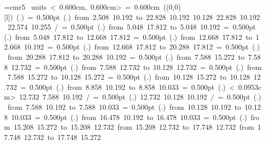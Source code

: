 \font\thinlinefont=cmr5
\mbox{\beginpicture
\setcoordinatesystem units < 0.600cm, 0.600cm>
\unitlength= 0.600cm
\linethickness=1pt
\setplotsymbol ({\makebox(0,0)[l]{\tencirc{}}})
\setshadesymbol ({\thinlinefont .})
\setlinear
%
%
\linethickness= 0.500pt
\setplotsymbol ({\thinlinefont .})
\putrule from  2.508 10.192 to 22.828 10.192
%
%
 10.128 22.828 10.192 22.574 10.255 /
%
%
%
\linethickness= 0.500pt
\setplotsymbol ({\thinlinefont .})
\putrule from  5.048 17.812 to  5.048 10.192
%
%
\linethickness= 0.500pt
\setplotsymbol ({\thinlinefont .})
\putrule from  5.048 17.812 to 12.668 17.812
%
%
\linethickness= 0.500pt
\setplotsymbol ({\thinlinefont .})
\putrule from 12.668 17.812 to 12.668 10.192
%
%
\linethickness= 0.500pt
\setplotsymbol ({\thinlinefont .})
\putrule from 12.668 17.812 to 20.288 17.812
%
%
\linethickness= 0.500pt
\setplotsymbol ({\thinlinefont .})
\putrule from 20.288 17.812 to 20.288 10.192
%
%
\linethickness= 0.500pt
\setplotsymbol ({\thinlinefont .})
\putrule from  7.588 15.272 to  7.588 12.732
%
%
\linethickness= 0.500pt
\setplotsymbol ({\thinlinefont .})
\putrule from  7.588 12.732 to 10.128 12.732
%
%
\linethickness= 0.500pt
\setplotsymbol ({\thinlinefont .})
\putrule from  7.588 15.272 to 10.128 15.272
%
%
\linethickness= 0.500pt
\setplotsymbol ({\thinlinefont .})
\putrule from 10.128 15.272 to 10.128 12.732
%
%
\linethickness= 0.500pt
\setplotsymbol ({\thinlinefont .})
\putrule from  8.858 10.192 to  8.858 10.033
%
%
\linethickness= 0.500pt
\setplotsymbol ({\thinlinefont .})
\setdots < 0.0953cm>
 12.732  7.588 10.192 /
%
%
\linethickness= 0.500pt
\setplotsymbol ({\thinlinefont .})
 12.732 10.128 10.192 /
%
%
\linethickness= 0.500pt
\setplotsymbol ({\thinlinefont .})
\setsolid
\putrule from  7.588 10.192 to  7.588 10.033
%
%
\linethickness= 0.500pt
\setplotsymbol ({\thinlinefont .})
\putrule from 10.128 10.192 to 10.128 10.033
%
%
\linethickness= 0.500pt
\setplotsymbol ({\thinlinefont .})
\putrule from 16.478 10.192 to 16.478 10.033
%
%
\linethickness= 0.500pt
\setplotsymbol ({\thinlinefont .})
\putrule from 15.208 15.272 to 15.208 12.732
\putrule from 15.208 12.732 to 17.748 12.732
\putrule from 17.748 12.732 to 17.748 15.272
}
